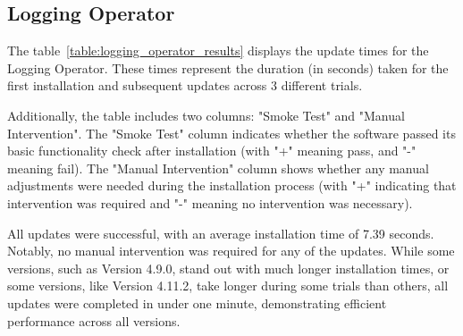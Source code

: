 \documentclass[../main.tex]{subfiles}
\begin{document}
\subsection{Logging Operator}

The table~\ref{table:logging_operator_results} displays the update times for the Logging Operator. These times represent the duration (in seconds) taken for the first installation and subsequent updates across 3 different trials.

Additionally, the table includes two columns: "Smoke Test" and "Manual Intervention". The "Smoke Test" column indicates whether the software passed its basic functionality check after installation (with "+" meaning pass, and "-" meaning fail). The "Manual Intervention" column shows whether any manual adjustments were needed during the installation process (with "+" indicating that intervention was required and "-" meaning no intervention was necessary).

All updates were successful, with an average installation time of 7.39 seconds. Notably, no manual intervention was required for any of the updates. While some versions, such as Version 4.9.0, stand out with much longer installation times, or some versions, like Version 4.11.2, take longer during some trials than others, all updates were completed in under one minute, demonstrating efficient performance across all versions.
\end{document}
